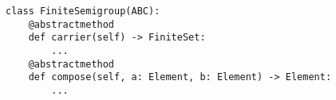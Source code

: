 \par\begin{minipage}{60ex}
\begin{verbatim}
class FiniteSemigroup(ABC):
    @abstractmethod
    def carrier(self) -> FiniteSet:
        ...
    @abstractmethod
    def compose(self, a: Element, b: Element) -> Element:
        ...
\end{verbatim}
\end{minipage}\par